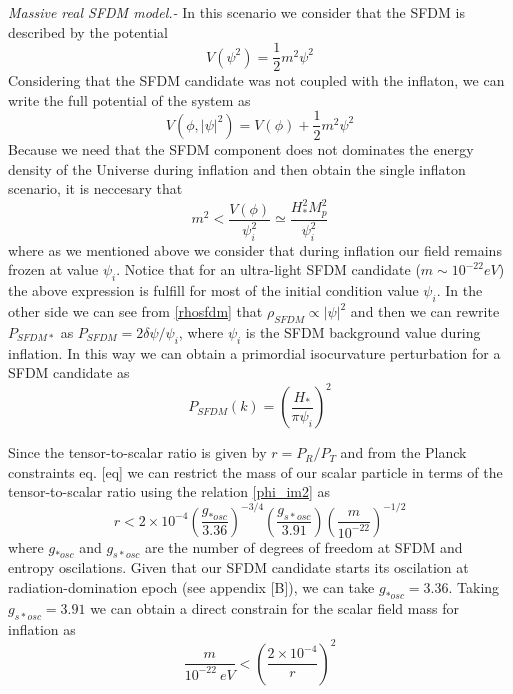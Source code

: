 \documentclass[twocolumn,           %
               showpacs,            %
               preprintnumbers,     %
               aps,                 %
               prl,          	    %
               letterpaper,             %
               superscriptaddress,      %
               nofootinbib,         %
               tightenlines,        %
               floats,floatfix      %
               ,usenatbib,
               ]{revtex4-1}
\begin{document}
\textit{Massive real SFDM model.-} In this scenario we consider that the SFDM is described by the potential
\begin{equation}
V(\psi^2)=\frac{1}{2}m^2\psi^2
\end{equation}
Considering that the SFDM candidate was not coupled with the inflaton, we can write the full potential of the system as
\begin{equation}
V(\phi,|\psi|^2)=V(\phi)+\frac{1}{2}m^2\psi^2
\end{equation}
Because we need that the SFDM component does not dominates the energy density of the Universe during inflation and then obtain the single inflaton scenario, it is neccesary that 
\begin{equation}
m^2 < \frac{V(\phi)}{\psi_i^2}\simeq \frac{H^2_{*}M_p^2}{\psi_i^2}
\end{equation}
where as we mentioned above we consider that during inflation our field remains frozen  at value $\psi_i$. Notice that for an ultra-light SFDM candidate  ($m\sim 10^{-22}eV$) the above expression is fulfill for most of the initial condition value $\psi_i$. In the other side we can see from \eqref{rhosfdm} that $\rho_{SFDM}\propto |\psi|^2$ and then we can rewrite $P_{SFDM*}$ as 
$P_{SFDM} = 2\delta \psi/\psi_i
$, where $\psi_i$ is the SFDM background value during inflation. In this way we can obtain a primordial isocurvature perturbation for a SFDM candidate as
\begin{equation}
P_{SFDM}(k)=\left(\frac{H_*}{\pi \psi_i}\right)^2
\end{equation}

Since the tensor-to-scalar ratio is given by $r=P_R/P_T$ and from the Planck constraints  eq. [eq] we can restrict the mass of our scalar particle in terms of the tensor-to-scalar ratio using the relation \eqref{phi_im2} as  
\begin{equation}
r<2\times 10^{-4}\left(\frac{g_{*osc}}{3.36}\right)^{-3/4}\left(\frac{g_{s*osc}}{3.91}\right)\left(\frac{m}{10^{-22}}\right)^{-1/2}
\end{equation}
where $g_{*osc}$ and $g_{s*osc}$ are the number of degrees of freedom at SFDM and entropy oscilations. Given that our SFDM candidate starts its oscilation at radiation-domination epoch (see appendix [B]), we can take $g_{*osc}=3.36$. Taking $g_{s*osc}=3.91$ we can obtain a direct constrain for the scalar field mass for inflation as 
\begin{equation}\label{constm}
\frac{m}{10^{-22}\ eV}<\left(\frac{2\times 10^{-4}}{r}\right)^2
\end{equation}
\end{document}
